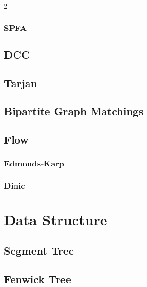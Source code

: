 \documentclass[10pt,a4paper]{article}
\begin{document}
\begin{multicols}{2}
\subsubsection{SPFA}


\subsection{DCC}



\subsection{Tarjan}



\subsection{Bipartite Graph Matchings}



\subsection{Flow}

\subsubsection{Edmonds-Karp}



\subsubsection{Dinic}





\newpage

\section{Data Structure}

\subsection{Segment Tree}


\subsection{Fenwick Tree}



\end{multicols}
\end{document}
